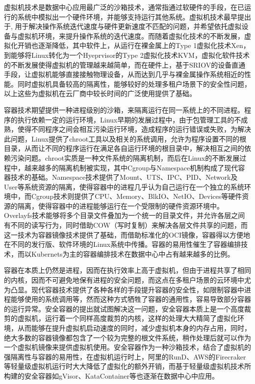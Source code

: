 虚拟机技术是数据中心应用最广泛的沙箱技术，通常指通过软硬件的手段，在已运行的系统中模拟出一个硬件环境，并能够支持运行其他系统。虚拟机技术最早提出于\citep{bugnion1997disco}, 用于解决操作系统迭代速度与硬件更新速度不匹配的问题，并希望依托虚拟设备与虚拟机环境，来提升操作系统的迭代速度。而随着虚拟化技术的不断发展，虚拟化开销也逐渐降低，其中软件上，从运行在裸金属上的Type 1虚拟化技术Xen\citep{barham2003xen}，到能够将Linux转化为一个Hyeprvisor的Type 2虚拟化技术KVM\citep{kivity2007kvm}，虚拟化软件技术的不断发展使得虚拟机的管理越来越简单，而在硬件上，基于SRIOV的设备直通手段\citep{dong2012high}，让虚拟机能够直接接触物理设备，从而达到几乎与裸金属操作系统相近的性能。同时虚拟机具备较高的隔离性，能够较好的处理多租户场景下的安全性问题，以上这些为虚拟机在云厂商中较长时间的广泛使用提供了基础。

容器技术期望提供一种进程级别的沙箱，来隔离运行在同一系统上的不同进程。程序的执行依赖一定的运行环境，Linux早期的发展过程中，由于包管理工具的不成熟，使得不同程序之间会相互污染运行环境，造成程序的运行错误或失败，为解决此问题，Linux提供了chroot工具以及相关的系统调用，允许为程序设置不同的根目录，从而让不同的程序运行在满足各自运行环境的根目录中，解决相互之间的依赖污染问题。chroot实质是一种文件系统的隔离机制，而后在Linux的不断发展过程中，越来越多的隔离机制被实现，其中Cgroup与Namespace机制构成了现代容器技术的基础。Namespace技术提供了Mount、UTS、IPC、PID、Network及User等系统资源的隔离，使得容器中的进程几乎认为自己运行在一个独立的系统环境中，而Cgroup技术则提供了CPU、Memory、BlkIO、NetIO、Devices等硬件资源的隔离，使得容器中的进程能够运行在一个受限制的硬件资源环境中。Overlayfs技术能够将多个目录文件叠加为一个统一的目录文件，并允许各层之间有不同的读写行为，同时借助COW（写时复制）来解决各层文件共享的问题，而这一技术为容器镜像技术提供了基础，而借助标准化的OCI镜像，容器得以方便地在不同的发行版、软件环境的Linux系统中传播。容器的易用性催生了容器编排技术，而以Kubernets为主的容器编排技术在数据中心中占有越来越多的比例。

容器在本质上仍然是进程，因而在执行效率上高于虚拟机，但由于进程共享了相同的内核，因而不可避免地保有进程的安全问题，而这点在多租户场景的云环境中尤为凸显。现代容器技术提供了各种各样的手段提升容器的安全性，如限制容器中进程能够使用的系统调用等，然而这种方式牺牲了容器的通用性，容易导致部分容器的运行异常。安全容器的提出就试图解决这一问题，安全容器本质上是一个高度裁剪的虚拟机，运行着一个同样高度裁剪的内核，这样的处理大大精简了虚拟化环境，从而能够在提升虚拟机启动速度的同时，减少虚拟机本身的内存占用，同时，绝大多数的容器镜像都包含了一个较为完整的根文件系统，稍作处理后就可以作为一个虚拟机镜像来提供虚拟机使用。安全容器作为一种沙箱技术，结合了虚拟机的强隔离性与容器的易用性，在虚拟机运行时上，阿里的RunD\citep{li2022rund}、AWS的Firecraker\citep{agache2020firecracker}等轻量级虚拟机运行时大大降低了虚拟化的额外开销，而基于轻量级虚拟机技术所构建的安全容器如gVisor、KataContainer\citep{randazzo2019kata}等也逐渐在数据中心中应用。

